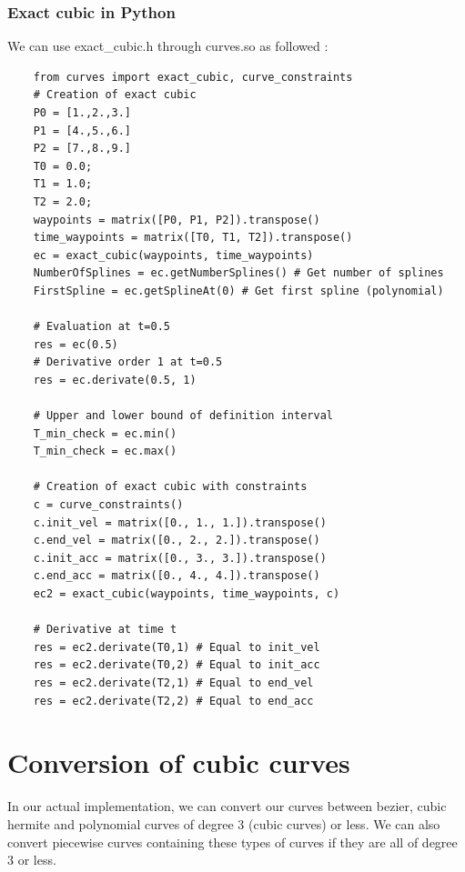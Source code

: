 \documentclass{article}
\begin{document}
    \subsubsection{Exact cubic in Python}

    We can use exact\_cubic.h through curves.so as followed :
    \begin{lstlisting}
    from curves import exact_cubic, curve_constraints
    # Creation of exact cubic
    P0 = [1.,2.,3.]
    P1 = [4.,5.,6.]
    P2 = [7.,8.,9.]
    T0 = 0.0;
    T1 = 1.0;
    T2 = 2.0;
    waypoints = matrix([P0, P1, P2]).transpose()
    time_waypoints = matrix([T0, T1, T2]).transpose()
    ec = exact_cubic(waypoints, time_waypoints)
    NumberOfSplines = ec.getNumberSplines() # Get number of splines
    FirstSpline = ec.getSplineAt(0) # Get first spline (polynomial)
    
    # Evaluation at t=0.5
    res = ec(0.5)
    # Derivative order 1 at t=0.5
    res = ec.derivate(0.5, 1)
    
    # Upper and lower bound of definition interval
    T_min_check = ec.min()
    T_min_check = ec.max()
    
    # Creation of exact cubic with constraints
    c = curve_constraints()
    c.init_vel = matrix([0., 1., 1.]).transpose()
    c.end_vel = matrix([0., 2., 2.]).transpose()
    c.init_acc = matrix([0., 3., 3.]).transpose()
    c.end_acc = matrix([0., 4., 4.]).transpose()
    ec2 = exact_cubic(waypoints, time_waypoints, c)
    
    # Derivative at time t
    res = ec2.derivate(T0,1) # Equal to init_vel
    res = ec2.derivate(T0,2) # Equal to init_acc
    res = ec2.derivate(T2,1) # Equal to end_vel
    res = ec2.derivate(T2,2) # Equal to end_acc
    \end{lstlisting}
    
\section{Conversion of cubic curves}

In our actual implementation, we can convert our curves between bezier, cubic hermite and polynomial curves of degree 3 (cubic curves) or less. We can also convert piecewise curves containing these types of curves if they are all of degree 3 or less.
\end{document}

